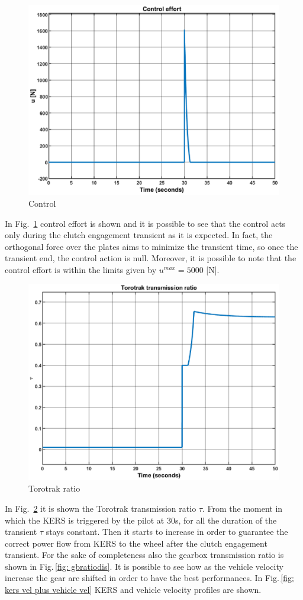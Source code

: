 \documentclass[11pt]{article}
\begin{document}
\begin{figure}[H]
	\centering
	\includegraphics[width=.6\textwidth]{Images/Results_Dynamics/Discharge/Control.eps}
	\caption{Control}
	\label{fig: controldis}
\end{figure}

In Fig.~\ref{fig: controldis} control effort is shown and it is possible to see that the control acts only during the clutch engagement transient as it is expected. In fact, the orthogonal force over the plates aims to minimize the transient time, so once the transient end, the control action is null. Moreover, it is possible to note that the control effort is within the limits given by $u^{max} = 5000$ [N].

\begin{figure}[H]
	\centering
	\includegraphics[width=.6\textwidth]{Images/Results_Dynamics/Discharge/Torotrak_ratio.eps}
	\caption{Torotrak ratio}
	\label{fig: tororatiodis}
\end{figure}

In Fig.~\ref{fig: tororatiodis} it is shown the Torotrak transmission ratio $\tau$. From the moment in which the KERS is triggered by the pilot at $30$s, for all the duration of the transient $\tau$ stays constant. Then it starts to increase in order to guarantee the correct power flow from KERS to the wheel after the clutch engagement transient. For the sake of completeness also the gearbox transmission ratio is shown in Fig.\,\ref{fig: gbratiodis}. It is possible to see how as the vehicle velocity increase the gear are shifted in order to have the best performances. In Fig.\,\ref{fig: kers vel plus vehicle vel} KERS and vehicle velocity profiles are shown.
\end{document}
